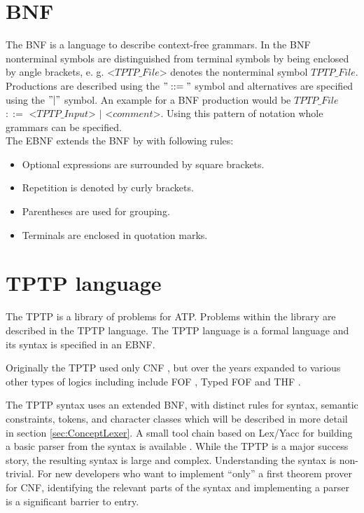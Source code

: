 
\section{\acf{BNF}}\label{sec:BackgroundBNF}

The \acf{BNF} is a language to describe context-free grammars.
In the \acf{BNF} nonterminal symbols are distinguished from terminal symbols by being enclosed by  angle brackets, e. g. <$TPTP\_File$> denotes the nonterminal symbol $TPTP\_File$.
Productions are described using the $"::="$ symbol and alternatives are specified using the $"|"$ symbol. \cite{BNF.1964}
An example for a \ac{BNF} production would be $TPTP\_File$ $::=$ <$TPTP\_Input$> $|$ <$comment$>.
Using this pattern of notation whole grammars can be specified.\\
The \ac{EBNF} extends the \ac{BNF} by with following rules:

\begin{itemize}%
	\item Optional expressions are surrounded by square brackets.
	\item Repetition is denoted by curly brackets.
	\item Parentheses are used for grouping.
	\item Terminals are enclosed in quotation marks.
\end{itemize}
\label{itemize:BackgroundBNF}
\cite{EBNF.1977}

\section{TPTP language}\label{sec:BackgroundTPTP}

The \acf{TPTP} is a library of problems for \ac{ATP}.
Problems within the library are described in the \ac{TPTP} language.
The  \ac{TPTP} language is a formal language and its syntax is specified in an \ac{EBNF}. \cite{Sut17}

Originally the \ac{TPTP} used only \ac{CNF} \cite{Sut09}, but over the
years expanded to various other types of logics including
include \ac{FOF} \cite{Sut09}, Typed \ac{FOF} \cite{SS+12, BP:CADE-2013} and \ac{THF} \cite{SB10, KSR:PAAR-2016}.

The TPTP syntax uses an extended \ac{BNF}, with distinct rules for syntax, semantic constraints, tokens, and character classes which will be described in more detail in section \ref{sec:ConceptLexer}.
A small tool chain based on Lex/Yacc for building a basic parser from the syntax is available \cite{VS06}.
While the TPTP is a major success story, the resulting syntax is large and complex.
Understanding the syntax is non-trivial.
For new developers who want to implement ``only'' a first theorem prover for \ac{CNF}, identifying the relevant parts of the syntax and implementing a parser is a significant barrier to entry.



